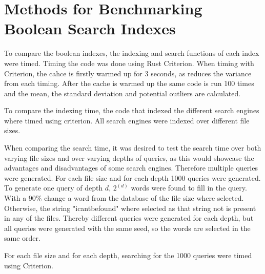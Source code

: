 \section{Methods for Benchmarking Boolean Search Indexes}
To compare the boolean indexes, the indexing and search functions of each index were timed. Timing the code was done using Rust Criterion. When timing with Criterion, the cahce is firstly warmed up for 3 seconds, as reduces the variance from each timing. After the cache is warmed up the same code is run 100 times and the mean, the standard deviation and potential outliers are calculated. 

To compare the indexing time, the code that indexed the different search engines where timed using criterion. All search engines were indexed over different file sizes.

When comparing the search time, it was desired to test the search time over both varying file sizes and over varying depths of queries, as this would showcase the advantages and disadvantages of some search engines. Therefore multiple queries were generated. For each file size and for each depth 1000 queries were generated. To generate one query of depth $d$, $2^(d)$ words were found to fill in the query. With a $90\%$ change a word from the database of the file size where selected. Otherwise, the string "icantbefound" where selected as that string not is present in any of the files. Thereby different queries were generated for each depth, but all queries were generated with the same seed, so the words are selected in the same order.

For each file size and for each depth, searching for the 1000 queries were timed using Criterion.